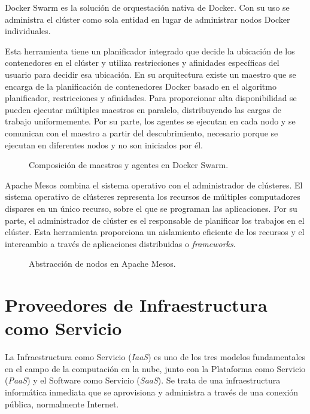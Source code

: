 Docker Swarm es la solución de orquestación nativa de Docker. Con su uso se administra el clúster como sola entidad en lugar de administrar nodos Docker individuales. 

Esta herramienta tiene un planificador integrado que decide la ubicación de los contenedores en el clúster y utiliza restricciones y afinidades específicas del usuario para decidir esa ubicación. En su arquitectura existe un maestro que se encarga de la planificación de contenedores Docker basado en el algoritmo planificador, restricciones y afinidades. Para proporcionar alta disponibilidad se pueden ejecutar múltiples maestros en paralelo, distribuyendo las cargas de trabajo uniformemente. Por su parte, los agentes se ejecutan en cada nodo y se comunican con el maestro a partir del descubrimiento, necesario porque se ejecutan en diferentes nodos y no son iniciados por él.

\begin{figure}[H]
\caption{Composición de maestros y agentes en Docker Swarm.\label{fig:figure_placement_example}}
\end{figure}
	
Apache Mesos combina el sistema operativo con el administrador de clústeres. El sistema operativo de clústeres representa los recursos de múltiples computadores dispares en un único recurso, sobre el que se programan las aplicaciones. Por su parte, el administrador de clúster es el responsable de planificar los trabajos en el clúster. Esta herramienta proporciona un aislamiento eficiente de los recursos y el intercambio a través de aplicaciones distribuidas o \textit{frameworks}.

\begin{figure}[H]
\caption{Abstracción de nodos en Apache Mesos.\label{fig:figure_placement_example}}
\end{figure}


\section{Proveedores de Infraestructura como Servicio}

La Infraestructura como Servicio (\textit{IaaS}) es uno de los tres modelos fundamentales en el campo de la computación en la nube, junto con la Plataforma como Servicio (\textit{PaaS}) y el Software como Servicio (\textit{SaaS}). Se trata de una infraestructura informática inmediata que se aprovisiona y administra a través de una conexión pública, normalmente Internet.

